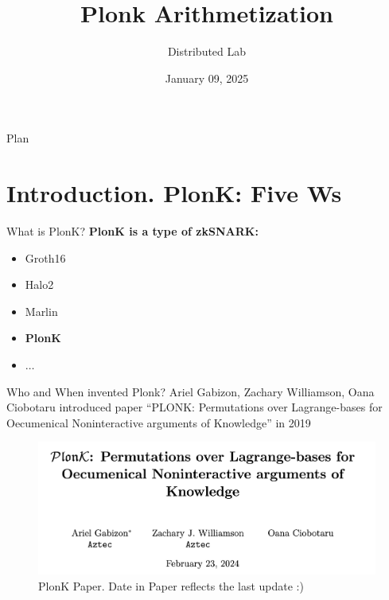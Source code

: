 \documentclass{zkdl-presentation-template}
\title[Plonk Arithmetization]{\textbf{Plonk Arithmetization}}
\author{Distributed Lab}
\date{January 09, 2025}
\begin{document}

    \begin{frame}{Plan}
        \tableofcontents
    \end{frame}

    \section{Introduction. PlonK: Five Ws}

    \begin{frame}{What is PlonK?}
        \textbf{PlonK is a type of zkSNARK:}
        \begin{itemize}
            \item Groth16
            \item Halo2
            \item Marlin
            \item \textbf{PlonK}
            \item $\dots$
        \end{itemize}
    \end{frame}

    \begin{frame}{Who and When invented Plonk?}
        Ariel Gabizon, Zachary Williamson, Oana Ciobotaru introduced paper ``PLONK: Permutations over Lagrange-bases for Oecumenical Noninteractive arguments of Knowledge'' in 2019

        \begin{figure}
            \centering
            \includegraphics[width=\textwidth]{images/lecture_12/plonk.png}
            \caption{PlonK Paper. Date in Paper reflects the last update :)}
        \end{figure}
    \end{frame}
\end{document}
